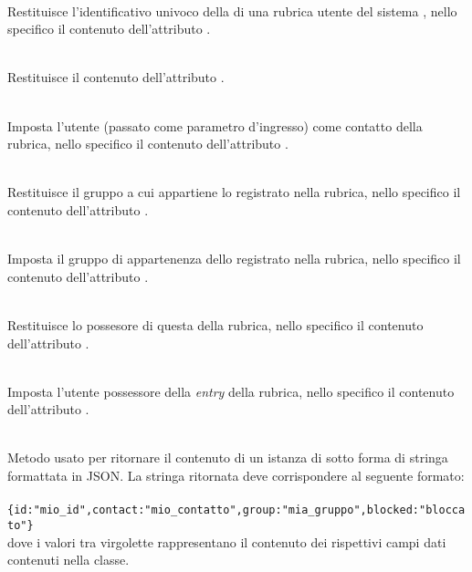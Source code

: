 \begin{description}
	\item{}\\
	Restituisce l'identificativo univoco della  di una rubrica utente del sistema \caName, nello specifico il contenuto dell'attributo .
	\item{}\\
	Restituisce il contenuto dell'attributo .
	\item{}\\
	Imposta l'utente  (passato come parametro d'ingresso) come contatto della rubrica, nello specifico il contenuto dell'attributo .
	\item{}\\
	Restituisce il gruppo a cui appartiene lo  registrato nella rubrica, nello specifico il contenuto dell'attributo .
	\item{}\\
	Imposta il gruppo di appartenenza dello  registrato nella rubrica, nello specifico il contenuto dell'attributo .
	\item{}\\
	Restituisce lo  possesore di questa  della rubrica, nello specifico il contenuto dell'attributo .
	\item{}\\
	Imposta l'utente  possessore della \textit{entry} della rubrica, nello specifico il contenuto dell'attributo .
	\item{}\\
	Metodo usato per ritornare il contenuto di un istanza di  sotto forma di stringa formattata in JSON. La stringa ritornata deve corrispondere al seguente formato:\\\\
	\verb|{id:"mio_id",contact:"mio_contatto",group:"mia_gruppo",blocked:"bloccato"}|\\
	
	dove i valori tra virgolette rappresentano il contenuto dei rispettivi campi dati contenuti nella classe.

\end{description}

